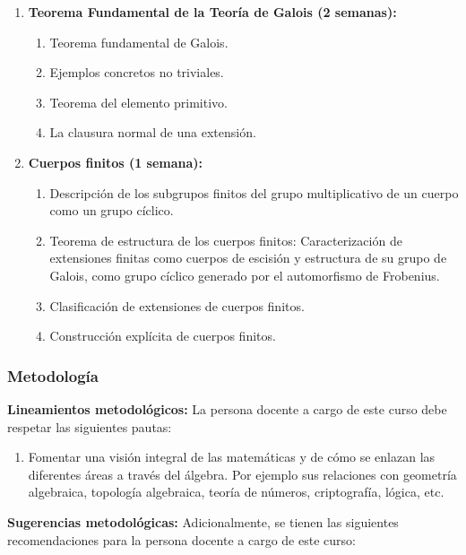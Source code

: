 \begin{refsection}
\begin{enumerate}
\item \textbf{Teorema Fundamental de la Teoría de Galois (2 semanas):}

\begin{enumerate}
    \item Teorema fundamental de Galois.
    \item Ejemplos concretos no triviales. 
    \item Teorema del elemento primitivo. 
    \item La clausura normal de una extensión. 
\end{enumerate}


\item \textbf{Cuerpos finitos (1 semana):}
\begin{enumerate}
       \item Descripción de los subgrupos finitos del grupo multiplicativo de un cuerpo como un grupo cíclico. 
    \item Teorema de estructura de los cuerpos finitos: Caracterización de extensiones finitas como cuerpos de escisión y estructura de su grupo de Galois, como grupo cíclico generado por el automorfismo de Frobenius. 
    \item Clasificación de extensiones de cuerpos finitos. 
    \item Construcción explícita de cuerpos finitos. 
\end{enumerate}

\end{enumerate}
\subsubsection*{Metodología}

\noindent \textbf{Lineamientos metodológicos:} La persona docente a cargo de este curso debe respetar las siguientes pautas:
\begin{enumerate}

    \item Fomentar una visión integral de las matemáticas y de cómo se enlazan las diferentes áreas a través del álgebra. Por ejemplo sus relaciones con geometría algebraica, topología algebraica, teoría de números, criptografía, lógica, etc.
\end{enumerate}

\textbf{Sugerencias metodológicas:} Adicionalmente, se tienen las siguientes recomendaciones para la persona docente a cargo de este curso:
\begin{enumerate}


\end{enumerate}
\end{refsection}
